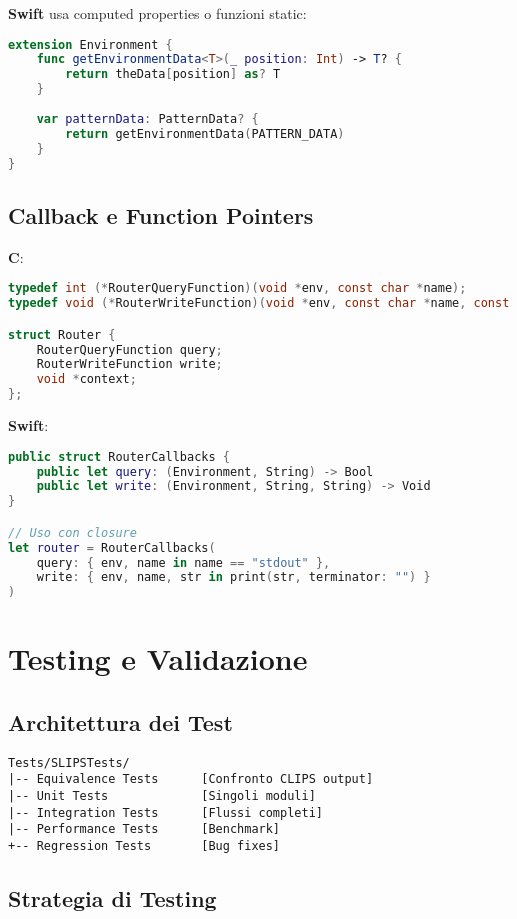 \textbf{Swift} usa computed properties o funzioni static:
\begin{lstlisting}[language=Swift]
extension Environment {
    func getEnvironmentData<T>(_ position: Int) -> T? {
        return theData[position] as? T
    }
    
    var patternData: PatternData? {
        return getEnvironmentData(PATTERN_DATA)
    }
}
\end{lstlisting}

\subsection{Callback e Function Pointers}

\textbf{C}:
\begin{lstlisting}[language=C]
typedef int (*RouterQueryFunction)(void *env, const char *name);
typedef void (*RouterWriteFunction)(void *env, const char *name, const char *str);

struct Router {
    RouterQueryFunction query;
    RouterWriteFunction write;
    void *context;
};
\end{lstlisting}

\textbf{Swift}:
\begin{lstlisting}[language=Swift]
public struct RouterCallbacks {
    public let query: (Environment, String) -> Bool
    public let write: (Environment, String, String) -> Void
}

// Uso con closure
let router = RouterCallbacks(
    query: { env, name in name == "stdout" },
    write: { env, name, str in print(str, terminator: "") }
)
\end{lstlisting}

\section{Testing e Validazione}

\subsection{Architettura dei Test}

\begin{verbatim}
Tests/SLIPSTests/
|-- Equivalence Tests      [Confronto CLIPS output]
|-- Unit Tests             [Singoli moduli]
|-- Integration Tests      [Flussi completi]
|-- Performance Tests      [Benchmark]
+-- Regression Tests       [Bug fixes]
\end{verbatim}

\subsection{Strategia di Testing}

